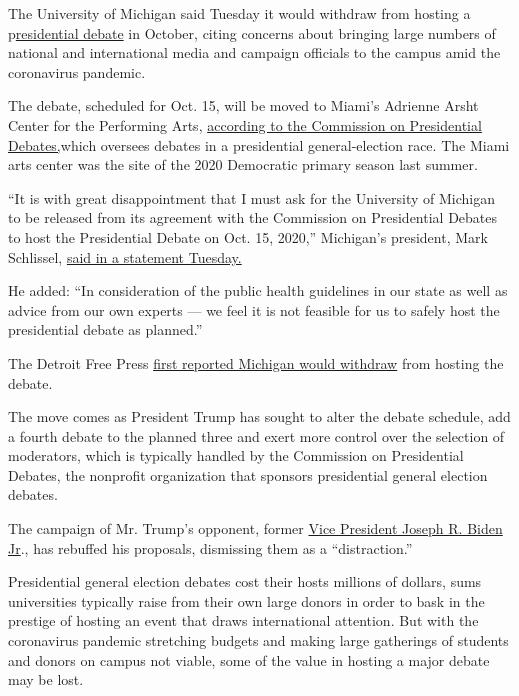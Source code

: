 The University of Michigan said Tuesday it would withdraw from hosting a
p\href{https://www.nytimes3xbfgragh.onion/2020/09/02/business/media/trump-biden-debate-moderators.html}{residential
debate} in October, citing concerns about bringing large numbers of
national and international media and campaign officials to the campus
amid the coronavirus pandemic.

The debate, scheduled for Oct. 15, will be moved to Miami's Adrienne
Arsht Center for the Performing Arts,
\href{https://www.debates.org/2020/06/23/statement-second-presidential-debate/}{according
to the Commission on Presidential Debates,}which oversees debates in a
presidential general-election race. The Miami arts center was the site
of the 2020 Democratic primary season last summer.

``It is with great disappointment that I must ask for the University of
Michigan to be released from its agreement with the Commission on
Presidential Debates to host the Presidential Debate on Oct. 15, 2020,''
Michigan's president, Mark Schlissel,
\href{https://record.umich.edu/articles/u-m-no-longer-hosting-oct-15-presidential-debate/}{said
in a statement Tuesday.}

He added: ``In consideration of the public health guidelines in our
state as well as advice from our own experts --- we feel it is not
feasible for us to safely host the presidential debate as planned.''

The Detroit Free Press
\href{https://www.freep.com/story/news/education/2020/06/22/u-m-withdraw-hosting-october-presidential-debate/3239836001/}{first
reported Michigan would withdraw} from hosting the debate.

The move comes as President Trump has sought to alter the debate
schedule, add a fourth debate to the planned three and exert more
control over the selection of moderators, which is typically handled by
the Commission on Presidential Debates, the nonprofit organization that
sponsors presidential general election debates.

The campaign of Mr. Trump's opponent, former
\href{https://www.nytimes3xbfgragh.onion/2020/06/30/us/politics/biden-transition-team.html}{Vice
President Joseph R. Biden Jr}., has rebuffed his proposals, dismissing
them as a ``distraction.''

Presidential general election debates cost their hosts millions of
dollars, sums universities typically raise from their own large donors
in order to bask in the prestige of hosting an event that draws
international attention. But with the coronavirus pandemic stretching
budgets and making large gatherings of students and donors on campus not
viable, some of the value in hosting a major debate may be lost.

